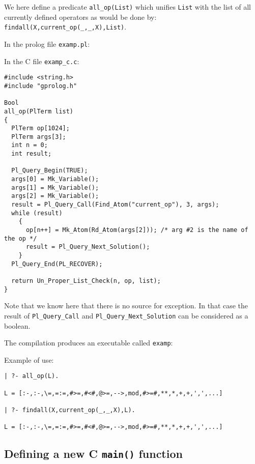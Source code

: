 We here define a predicate \texttt{all\_op(List)} which unifies
\texttt{List} with the list of all currently defined operators as would be done by: \texttt{findall(X,current\_op(\_,\_,X),List)}.

In the prolog file \texttt{examp.pl}:


In the C file \texttt{examp\_c.c}:

\begin{Indentation}
\begin{verbatim}
#include <string.h>
#include "gprolog.h"

Bool
all_op(PlTerm list)
{
  PlTerm op[1024];
  PlTerm args[3];
  int n = 0;
  int result;

  Pl_Query_Begin(TRUE);
  args[0] = Mk_Variable();
  args[1] = Mk_Variable();
  args[2] = Mk_Variable();
  result = Pl_Query_Call(Find_Atom("current_op"), 3, args);
  while (result)
    {
      op[n++] = Mk_Atom(Rd_Atom(args[2])); /* arg #2 is the name of the op */
      result = Pl_Query_Next_Solution();
    }
  Pl_Query_End(PL_RECOVER);

  return Un_Proper_List_Check(n, op, list);
}
\end{verbatim}
\end{Indentation}

Note that we know here that there is no source for exception. In that case
the result of \texttt{Pl\_Query\_Call} and \texttt{Pl\_Query\_Next\_Solution}
can be considered as a boolean.

The compilation produces an executable called \texttt{examp}:


Example of use:

\begin{Indentation}
\begin{verbatim}
| ?- all_op(L).

L = [:-,:-,\=,=:=,#>=,#<#,@>=,-->,mod,#>=#,**,*,+,+,',',...]

| ?- findall(X,current_op(_,_,X),L).

L = [:-,:-,\=,=:=,#>=,#<#,@>=,-->,mod,#>=#,**,*,+,+,',',...]
\end{verbatim}
\end{Indentation}


\subsection{Defining a new C \texttt{main()} function}

